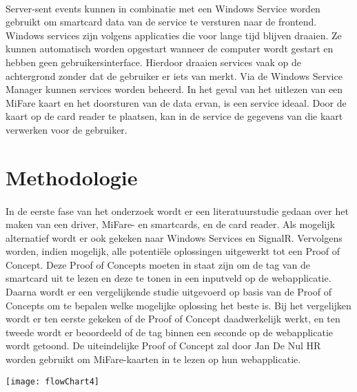 \paragraph{}
Server-sent events kunnen in combinatie met een Windows Service worden gebruikt om smartcard data van de service te versturen naar de frontend.
Windows services zijn volgens \textcite{MicrosoftWS} applicaties die voor lange tijd blijven draaien. Ze kunnen automatisch worden opgestart wanneer de computer wordt gestart en hebben geen gebruikersinterface. Hierdoor draaien services vaak op de achtergrond zonder dat de gebruiker er iets van merkt. Via de Windows Service Manager kunnen services worden beheerd. In het geval van het uitlezen van een MiFare kaart en het doorsturen van de data ervan, is een service ideaal. Door de kaart op de card reader te plaatsen, kan in de service de gegevens van die kaart verwerken voor de gebruiker.

\bigskip
\section{Methodologie}%
\label{sec:methodologie}
\paragraph{}
In de eerste fase van het onderzoek wordt er een literatuurstudie gedaan over het maken van een driver, MiFare- en smartcards, en de card reader. Als mogelijk alternatief wordt er ook gekeken naar Windows Services en SignalR. Vervolgens worden, indien mogelijk, alle potentiële oplossingen uitgewerkt tot een Proof of Concept. Deze Proof of Concepts moeten in staat zijn om de tag van de smartcard uit te lezen en deze te tonen in een inputveld op de webapplicatie.
Daarna wordt er een vergelijkende studie uitgevoerd op basis van de Proof of Concepts om te bepalen welke mogelijke oplossing het beste is. Bij het vergelijken wordt er ten eerste gekeken of de Proof of Concept daadwerkelijk werkt, en ten tweede wordt er beoordeeld of de tag binnen een seconde op de webapplicatie wordt getoond.
De uiteindelijke Proof of Concept zal door Jan De Nul HR worden gebruikt om MiFare-kaarten in te lezen op hun webapplicatie.

\begin{center}
    \texttt{[image: flowChart4]}
\end{center}

\bigskip
